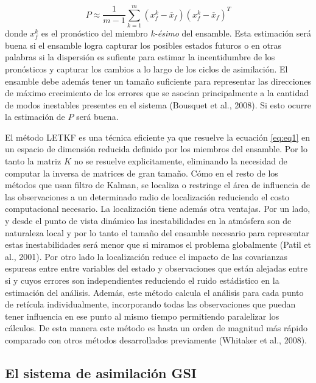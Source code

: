 \documentclass[12pt,oneside,a4paper]{reedthesis}
\begin{document}
\begin{equation}
P \approx \frac{1}{m-1} \sum_{k=1}^{m}(x_{f}^{k}-\overline{x}_f)(x_{f}^{k}-\overline{x}_f)^T
\label{eq:eq5}
\end{equation}
donde \(x_{f}^{k}\) es el pronóstico del miembro \emph{k-ésimo} del ensamble. Esta estimación será buena si el ensamble logra capturar los posibles estados futuros o en otras palabras si la dispersión es sufiente para estimar la incentidumbre de los pronósticos y capturar los cambios a lo largo de los ciclos de asimilación. El ensamble debe además tener un tamaño suficiente para representar las direcciones de máximo crecimiento de los errores que se asocian principalmente a la cantidad de modos inestables presentes en el sistema (Bousquet et al., 2008). Si esto ocurre la estimación de \(P\) será buena.

El método LETKF es una técnica eficiente ya que resuelve la ecuación \eqref{eq:eq1} en un espacio de dimensión reducida definido por los miembros del ensamble. Por lo tanto la matriz \(K\) no se resuelve explicitamente, eliminando la necesidad de computar la inversa de matrices de gran tamaño. Cómo en el resto de los métodos que usan filtro de Kalman, se localiza o restringe el área de influencia de las observaciones a un determinado radio de localización reduciendo el costo computacional necesario. La localización tiene además otra ventajas. Por un lado, y desde el punto de vista dinámico las inestabilidades en la atmósfera son de naturaleza local y por lo tanto el tamaño del ensamble necesario para representar estas inestabilidades será menor que si miramos el problema globalmente (Patil et al., 2001). Por otro lado la localización reduce el impacto de las covarianzas espureas entre entre variables del estado y observaciones que están alejadas entre si y cuyos errores son independientes reduciendo el ruido estádistico en la estimación del análisis. Además, este método calcula el análisis para cada punto de retícula individualmente, incorporando todas las observaciones que puedan tener influencia en ese punto al mismo tiempo permitiendo paralelizar los cálculos. De esta manera este método es hasta un orden de magnitud más rápido comparado con otros métodos desarrollados previamente (Whitaker et al., 2008).

\hypertarget{el-sistema-de-asimilaciuxf3n-gsi}{%
\subsection{El sistema de asimilación GSI}\label{el-sistema-de-asimilaciuxf3n-gsi}}
\end{document}
